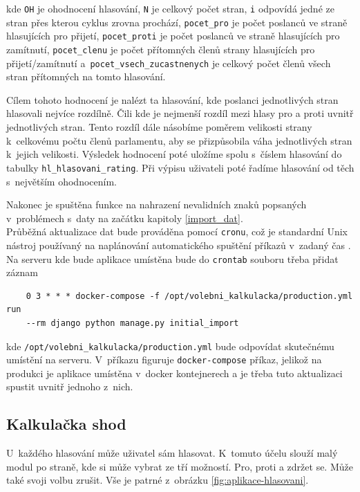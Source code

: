 kde \texttt{OH} je ohodnocení hlasování, \texttt{N} je celkový počet stran, \texttt{i} odpovídá jedné ze stran přes kterou cyklus zrovna prochází, \texttt{pocet\_pro} je počet poslanců ve straně hlasujících pro přijetí, \texttt{pocet\_proti} je počet poslanců ve straně hlasujících pro zamítnutí, \texttt{pocet\_clenu} je počet přítomných členů strany hlasujících pro přijetí/zamítnutí a~\texttt{pocet\_vsech\_zucastnenych} je celkový počet členů všech stran přítomných na tomto hlasování.

\par Cílem tohoto hodnocení je nalézt ta hlasování, kde poslanci jednotlivých stran hlasovali nejvíce rozdílně. Čili kde je nejmenší rozdíl mezi hlasy pro a proti uvnitř jednotlivých stran. Tento rozdíl dále násobíme poměrem velikosti strany k~celkovému počtu členů parlamentu, aby se přizpůsobila váha jednotlivých stran k~jejich velikosti. Výsledek hodnocení poté uložíme spolu s~číslem hlasování do tabulky \texttt{hl\_hlasovani\_rating}. Při výpisu uživateli poté řadíme hlasování od těch s~největším ohodnocením.\\

\par Nakonec je spuštěna funkce na nahrazení nevalidních znaků popsaných v~problémech s~daty na začátku kapitoly \ref{import_dat}.\\

Průběžná aktualizace dat bude prováděna pomocí \texttt{cronu}, což je standardní Unix nástroj používaný na naplánování automatického spuštění příkazů v~zadaný čas \cite{cron}. Na serveru kde bude aplikace umístěna bude do \texttt{crontab} souboru třeba přidat záznam
\begin{verbatim}
    0 3 * * * docker-compose -f /opt/volebni_kalkulacka/production.yml run 
    --rm django python manage.py initial_import
\end{verbatim}
kde \texttt{/opt/volebni\_kalkulacka/production.yml} bude odpovídat skutečnému umístění na serveru. V~příkazu figuruje \texttt{docker-compose} příkaz, jelikož na produkci je aplikace umístěna v~docker kontejnerech a je třeba tuto aktualizaci spustit uvnitř jednoho z~nich. 

\subsection{Kalkulačka shod}
U~každého hlasování může uživatel sám hlasovat. K~tomuto účelu slouží malý modul po straně, kde si může vybrat ze tří možností. Pro, proti a zdržet se. Může také svoji volbu zrušit. Vše je patrné z~obrázku \ref{fig:aplikace-hlasovani}.

